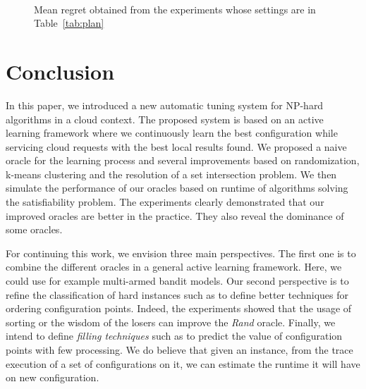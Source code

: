 \documentclass[10pt, conference, compsocconf]{IEEEtran}
\begin{document}
\begin{figure}[ht]
{}
\\

\caption{Mean regret obtained from the experiments whose settings are in Table~\ref{tab:plan}}
\label{fig:regret}
\end{figure}

\section{Conclusion} \label{Conclusion}

In this paper, we introduced a new automatic tuning system for NP-hard algorithms in a cloud 
context. The proposed system is based on an active learning framework where we continuously 
learn the best configuration while servicing cloud requests with the best local results found. 
We proposed a naive oracle for the learning process and several  
 improvements based on randomization, k-means clustering and the resolution of a set intersection problem. 
We then simulate the performance of our oracles based on runtime of algorithms solving the satisfiability 
problem. The experiments clearly demonstrated that our improved oracles are better in the practice. 
They also reveal the dominance of some oracles. 

For continuing this work, we envision three main perspectives. The first one is to combine the different 
oracles in a general active learning framework. Here, we could 
use for example multi-armed bandit models. Our second perspective is to refine the classification of hard 
instances such as to define better techniques for ordering configuration points. Indeed, the experiments showed  
that the usage of sorting or the wisdom of the losers can improve the {\it Rand} oracle. Finally, we intend 
to define {\it filling techniques} such as to predict the value of configuration points with few processing. 
We do believe that given an instance, from the trace execution of a set of configurations on it,  we can estimate the runtime 
it will have on new configuration.







\end{document}
